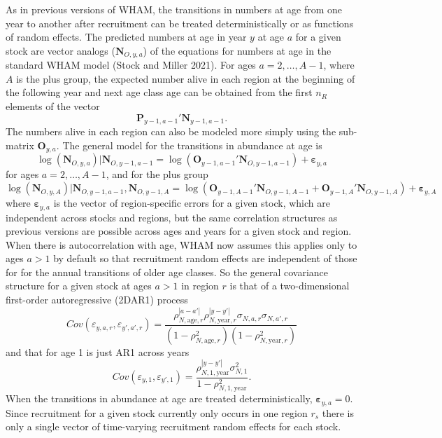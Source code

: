 \documentclass[
]{article}
\begin{document}
As in previous versions of WHAM, the transitions in numbers at age from
one year to another after recruitment can be treated deterministically
or as functions of random effects. The predicted numbers at age in year
\(y\) at age \(a\) for a given stock are vector analogs
(\(\mathbf{N}_{O,y,a}\)) of the equations for numbers at age in the
standard WHAM model (Stock and Miller 2021). For ages
\(a = 2,\ldots, A-1\), where \(A\) is the plus group, the expected
number alive in each region at the beginning of the following year and
next age class age can be obtained from the first \(n_R\) elements of
the vector \[\mathbf{P}_{y-1,a-1}' \mathbf{N}_{y-1,a-1}.\] The numbers
alive in each region can also be modeled more simply using the
sub-matrix \(\mathbf{O}_{y,a}\). The general model for the transitions
in abundance at age is \begin{equation*}
\log\left(\mathbf{N}_{O,y,a}\right)|\mathbf{N}_{O,y-1,a-1} =  \log\left(\mathbf{O}_{y-1,a-1}' \mathbf{N}_{O,y-1,a-1}\right) + \boldsymbol{\varepsilon}_{y,a}
\end{equation*} for ages \(a = 2,\ldots, A-1\), and for the plus group
\begin{equation*}
\log\left(\mathbf{N}_{O,y,A}\right)|\mathbf{N}_{O,y-1,a-1},\mathbf{N}_{O,y-1,A} = \log\left(\mathbf{O}_{y-1,A-1}' \mathbf{N}_{O,y-1,A-1} + \mathbf{O}_{y-1,A}' \mathbf{N}_{O,y-1,A}\right) + \boldsymbol{\varepsilon}_{y,A}
\end{equation*} where \(\boldsymbol{\varepsilon}_{y,a}\) is the vector
of region-specific errors for a given stock, which are independent
across stocks and regions, but the same correlation structures as
previous versions are possible across ages and years for a given stock
and region. When there is autocorrelation with age, WHAM now assumes
this applies only to ages \(a>1\) by default so that recruitment random
effects are independent of those for for the annual transitions of older
age classes. So the general covariance structure for a given stock at
ages \(a>1\) in region \(r\) is that of a two-dimensional first-order
autoregressive (2DAR1) process \begin{equation*}
  Cov\left(\varepsilon_{y,a,r},\varepsilon_{y',a',r}\right) =   \frac{\rho_{N,\text{age},r}^{|a-a'|}\rho_{N,\text{year},r}^{|y-y'|}\sigma_{N,a,r}\sigma_{N,a',r}}{\left(1 -  \rho_{N,\text{age},r}^2\right)\left(1 - \rho_{N,\text{year},r}^2\right)} 
\end{equation*} and that for age 1 is just AR1 across years
\begin{equation*}
  Cov\left(\varepsilon_{y,1},\varepsilon_{y',1}\right) =   \frac{\rho_{N,1,\text{year}}^{|y-y'|}\sigma^2_{N,1}}{1 - \rho_{N,1,\text{year}}^2}.
\end{equation*} When the transitions in abundance at age are treated
deterministically, \(\boldsymbol{\varepsilon}_{y,a} = 0\). Since
recruitment for a given stock currently only occurs in one region
\(r_s\) there is only a single vector of time-varying recruitment random
effects for each stock.
\end{document}
